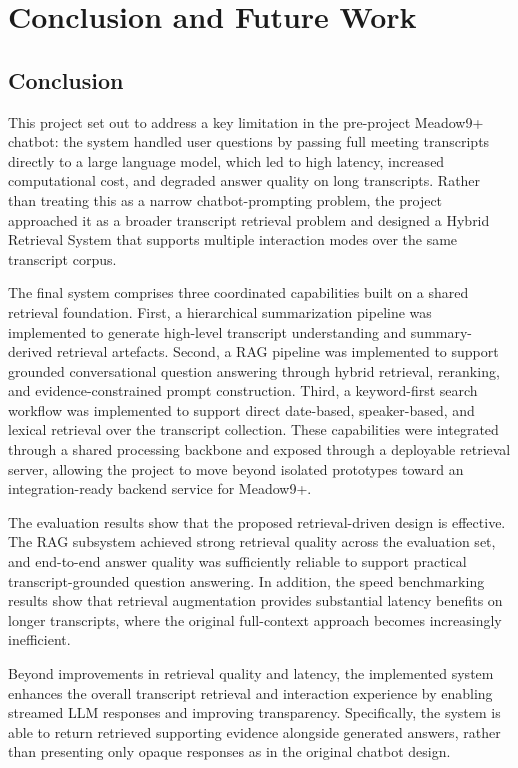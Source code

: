 \chapter{Conclusion and Future Work}

\section{Conclusion}
This project set out to address a key limitation in the pre-project Meadow9+ chatbot: the system handled user questions by passing full meeting transcripts directly to a large language model, which led to high latency, increased computational cost, and degraded answer quality on long transcripts. Rather than treating this as a narrow chatbot-prompting problem, the project approached it as a broader transcript retrieval problem and designed a Hybrid Retrieval System that supports multiple interaction modes over the same transcript corpus.

The final system comprises three coordinated capabilities built on a shared retrieval foundation. First, a hierarchical summarization pipeline was implemented to generate high-level transcript understanding and summary-derived retrieval artefacts. Second, a RAG pipeline was implemented to support grounded conversational question answering through hybrid retrieval, reranking, and evidence-constrained prompt construction. Third, a keyword-first search workflow was implemented to support direct date-based, speaker-based, and lexical retrieval over the transcript collection. These capabilities were integrated through a shared processing backbone and exposed through a deployable retrieval server, allowing the project to move beyond isolated prototypes toward an integration-ready backend service for Meadow9+.

The evaluation results show that the proposed retrieval-driven design is effective. The RAG subsystem achieved strong retrieval quality across the evaluation set, and end-to-end answer quality was sufficiently reliable to support practical transcript-grounded question answering. In addition, the speed benchmarking results show that retrieval augmentation provides substantial latency benefits on longer transcripts, where the original full-context approach becomes increasingly inefficient. 

Beyond improvements in retrieval quality and latency, the implemented system enhances the overall transcript retrieval and interaction experience by enabling streamed LLM responses and improving transparency. Specifically, the system is able to return retrieved supporting evidence alongside generated answers, rather than presenting only opaque responses as in the original chatbot design.

